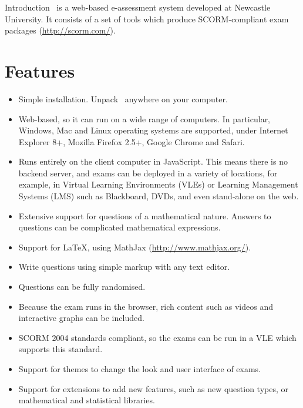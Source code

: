 %
%
%

\begin{chapter}{\label{cha:introduction}Introduction}
  \numbas\ is a web-based e-assessment system developed at Newcastle
  University.  It consists of a set of tools which produce SCORM-compliant exam
  packages (\url{http://scorm.com/}).

  \section{Features}
  \begin{itemize}
    \item Simple installation.  Unpack \numbas\ anywhere on your computer.
    \item Web-based, so it can run on a wide range of computers.  In
      particular, Windows, Mac and Linux operating systems are supported, under
      Internet Explorer 8+, Mozilla Firefox 2.5+, Google Chrome and Safari.
    \item Runs entirely on the client computer in JavaScript.  This means there
      is no backend server, and exams can be deployed in a variety of
      locations, for example, in Virtual Learning Environments (VLEs) or
      Learning Management Systems (LMS) such as Blackboard, DVDs, and even
      stand-alone on the web.
    \item Extensive support for questions of a mathematical nature. Answers to
      questions can be complicated mathematical expressions.
    \item Support for \LaTeX, using MathJax (\url{http://www.mathjax.org/}).
    \item Write questions using simple markup with any text editor.
    \item Questions can be fully randomised.
    \item Because the exam runs in the browser, rich content such as videos and
      interactive graphs can be included.
    \item SCORM 2004 standards compliant, so the exams can be run in a VLE
      which supports this standard.
    \item Support for themes to change the look and user interface of exams.
    \item Support for extensions to add new features, such as new question
      types, or mathematical and statistical libraries.
  \end{itemize}


\end{chapter}
